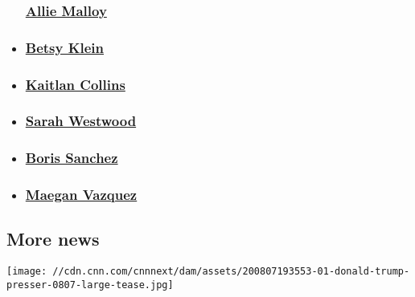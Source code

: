 \begin{itemize}
{  \subsubsection{\texorpdfstring{\href{/profiles/allie-malloy}{Allie
  Malloy}}{Allie Malloy}}\label{allie-malloy}}
\item
  \hypertarget{betsy-klein}{%
  \subsubsection{\texorpdfstring{\href{/profiles/betsy-klein}{Betsy
  Klein}}{Betsy Klein}}\label{betsy-klein}}
\item
  \hypertarget{kaitlan-collins}{%
  \subsubsection{\texorpdfstring{\href{/profiles/kaitlan-collins}{Kaitlan
  Collins}}{Kaitlan Collins}}\label{kaitlan-collins}}
\item
  \hypertarget{sarah-westwood}{%
  \subsubsection{\texorpdfstring{\href{/profiles/sarah-westwood}{Sarah
  Westwood}}{Sarah Westwood}}\label{sarah-westwood}}
\item
  \hypertarget{boris-sanchez}{%
  \subsubsection{\texorpdfstring{\href{/profiles/boris-sanchez-profile}{Boris
  Sanchez}}{Boris Sanchez}}\label{boris-sanchez}}
\item
  \hypertarget{maegan-vazquez}{%
  \subsubsection{\texorpdfstring{\href{/profiles/maegan-vazquez}{Maegan
  Vazquez}}{Maegan Vazquez}}\label{maegan-vazquez}}
\end{itemize}

\hypertarget{more-news-}{%
\subsection{More news~}\label{more-news-}}

\href{/2020/08/08/politics/trump-executive-order-stimulus/index.html}{}

\texttt{[image: //cdn.cnn.com/cnnnext/dam/assets/200807193553-01-donald-trump-presser-0807-large-tease.jpg]}

